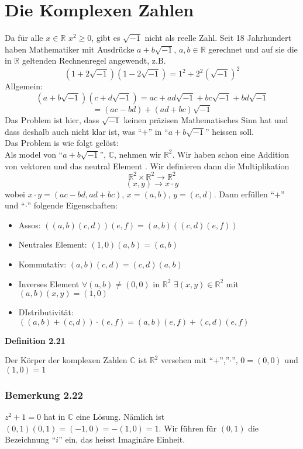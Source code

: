 \section{Die Komplexen Zahlen}
Da für alle $x\in\mathbb{R}$ $x^2\geq 0$, gibt es $\sqrt{-1}$ nicht als reelle Zahl. Seit 18 Jahrhundert haben Mathematiker mit Ausdrücke $a+b\sqrt{-1}$, $a,b\in\mathbb{R}$ gerechnet und auf sie die in $\mathbb{R}$ geltenden Rechnenregel angewendt, z.B. $$\left( 1+2\sqrt{-1}\right)\left( 1-2\sqrt{-1}\right) = 1^2 + 2^2\left( \sqrt{-1}\right)^2$$
Allgemein:
$$\left( a+b\sqrt{-1} \right)\left( c+d\sqrt{-1}\right) = ac + ad\sqrt{-1} + bc\sqrt{-1}+bd\sqrt{-1}$$
$$=\left( ac-bd\right)+\left(ad+bc\right)\sqrt{-1}$$
Das Problem ist hier, dass $\sqrt{-1}$ keinen präzisen Mathematisches Sinn hat und dass deshalb auch nicht klar ist, was ``$+$'' in ``$a+b\sqrt{-1}$'' heissen soll. \\

\noindent Das Problem is wie folgt gelöst:\\

Als model von ``$a+b\sqrt{-1}$'', $\mathbb{C}$, nehmen wir $\mathbb{R}^2$. Wir haben schon eine Addition von vektoren und das neutral Element . Wir definieren dann die Multiplikation $$\mathbb{R}^2 \times\mathbb{R}^2 \rightarrow \mathbb{R}^2$$ $$(x,y)\rightarrow x\cdot y $$
wobei $x\cdot y=(ac-bd,ad+bc)$, $x=(a,b)$, $y=(c,d)$. Dann erfüllen ``$+$'' und ``$\cdot$'' folgende Eigenschaften:
\begin{itemize}
\item Assos: $\left((a,b)(c,d)\right)(e,f)=(a,b)\left((c,d)(e,f) \right)$
\item Neutrales Element: $(1,0)(a,b)=(a,b)$
\item Kommutativ: $(a,b)(c,d)=(c,d)(a,b)$
\item Inverses Element $\forall (a,b)\not = (0,0)$ in $\mathbb{R}^2$ $\exists(x,y)\in\mathbb{R}^2$ mit $(a,b)(x,y)=(1,0)$
\item DIstributivität: $\left( (a,b)+(c,d)\right)\cdot (e,f)=(a,b)(e,f)+(c,d)(e,f)$
\end{itemize}

\begin{framed}
\centerline{\textbf{Definition 2.21}}
\noindent Der Körper der komplexen Zahlen $\mathbb{C}$ ist $\mathbb{R}^2$ versehen mit ``$+$'',''$\cdot$'', $0=(0,0)$ und $(1,0)=1$
\end{framed}

\subsubsection*{Bemerkung 2.22}
$z^2+1=0$ hat in $\mathbb{C}$ eine Lösung. Nämlich ist $(0,1)(0,1)=(-1,0)=-(1,0)=1$. Wir führen für $(0,1)$ die Bezeichnung ``$i$'' ein, das heisst Imaginäre Einheit.\\

